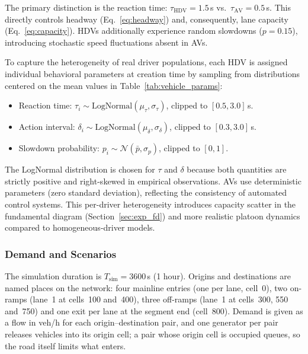 \documentclass[review,number]{elsarticle} %
\begin{document}
The primary distinction is the reaction time: $\tau_{\text{HDV}} = 1.5$\,s vs.\ $\tau_{\text{AV}} = 0.5$\,s. This directly controls headway (Eq.~\ref{eq:headway}) and, consequently, lane capacity (Eq.~\ref{eq:capacity}). HDVs additionally experience random slowdowns ($p = 0.15$), introducing stochastic speed fluctuations absent in AVs.

To capture the heterogeneity of real driver populations, each HDV is assigned individual behavioral parameters at creation time by sampling from distributions centered on the mean values in Table~\ref{tab:vehicle_params}:
\begin{itemize}
    \item Reaction time: $\tau_i \sim \text{LogNormal}(\mu_\tau, \sigma_\tau)$, clipped to $[0.5, 3.0]$\,s.
    \item Action interval: $\delta_i \sim \text{LogNormal}(\mu_\delta, \sigma_\delta)$, clipped to $[0.3, 3.0]$\,s.
    \item Slowdown probability: $p_i \sim \mathcal{N}(\bar{p}, \sigma_p)$, clipped to $[0, 1]$.
\end{itemize}
The LogNormal distribution is chosen for $\tau$ and $\delta$ because both quantities are strictly positive and right-skewed in empirical observations. AVs use deterministic parameters (zero standard deviation), reflecting the consistency of automated control systems. This per-driver heterogeneity introduces capacity scatter in the fundamental diagram (Section~\ref{sec:exp_fd}) and more realistic platoon dynamics compared to homogeneous-driver models.

\subsubsection{Demand and Scenarios}
\label{sec:demand}

The simulation duration is $T_{\text{sim}} = 3600$\,s (1 hour). Origins and destinations are named places on the network: four mainline entries (one per lane, cell~0), two on-ramps (lane~1 at cells~100 and~400), three off-ramps (lane~1 at cells~300, 550 and~750) and one exit per lane at the segment end (cell~800). Demand is given as a flow in veh/h for each origin--destination pair, and one generator per pair releases vehicles into its origin cell; a pair whose origin cell is occupied queues, so the road itself limits what enters.
\end{document}
